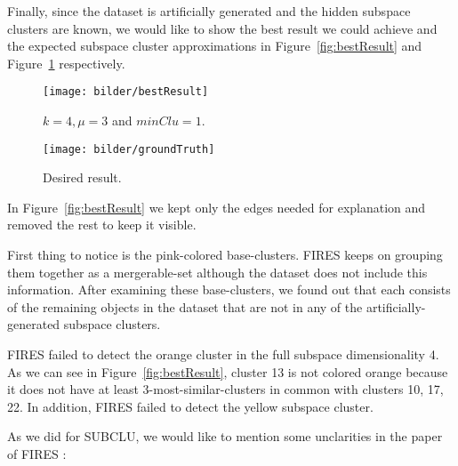 Finally, since the dataset is artificially generated and the hidden subspace clusters are known, we would like to show the best result we could achieve and the expected subspace cluster approximations in Figure~\ref{fig:bestResult} and Figure~\ref{fig:groundTruth} respectively.

\begin{figure}[H]
	\centering
	\begin{minipage}{0.5\textwidth}
		\centering
		\texttt{[image: bilder/bestResult]}
		\caption{$k = 4, \mu = 3$ and $minClu = 1.$}
		\label{fig:bestResult}
	\end{minipage}\hfill
	\begin{minipage}{0.5\textwidth}
		\centering
		\texttt{[image: bilder/groundTruth]}
		\caption{Desired result.}
		\label{fig:groundTruth}
	\end{minipage}
\end{figure}  

In Figure~\ref{fig:bestResult} we kept only the edges needed for explanation and removed the rest to keep it visible.

First thing to notice is the pink-colored base-clusters. FIRES keeps on grouping them together as a mergerable-set although the dataset does not include this information. After examining these base-clusters, we found out that each consists of the remaining objects in the dataset that are not in any of the artificially-generated subspace clusters.

FIRES failed to detect the orange cluster in the full subspace dimensionality 4. As we can see in Figure~\ref{fig:bestResult}, cluster 13 is not colored orange because it does not have at least 3-most-similar-clusters in common with clusters 10, 17, 22. In addition, FIRES failed to detect the yellow subspace cluster.

As we did for SUBCLU, we would like to mention some unclarities in the paper of FIRES \citep{fires}:


